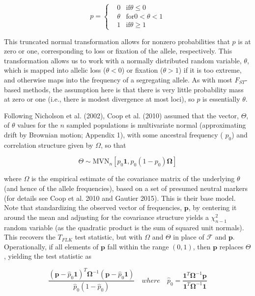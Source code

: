 \documentclass{article}
\begin{document}
\begin{equation}
p=\left\{\begin{aligned}&0&\text{if}\theta\leq0\\&\theta&\text{for}0<\theta<1\\&1&\text{if}\theta\geq1\end{aligned}\right.
\tag{9.13a}
\label{eq:9_13a}
\end{equation}

This truncated normal transformation allows for nonzero probabilities that $p$ is at zero or one, corresponding to loss or fixation of the allele, respectively. This transformation allows us to work with a normally distributed random variable, $\theta$, which is mapped into allelic loss ($\theta < 0$) or fixation ($\theta > 1$) if it is too extreme, and otherwise maps into the frequency of a segregating allele. As with most $F_{ST}$-based methods, the assumption here is that there is very little probability mass at zero or one (i.e., there is modest divergence at most loci), so $p$ is essentially $\theta$.

Following Nicholson et al. (2002), Coop et al. (2010) assumed that the vector,  $ \Theta $, of  $ \theta $ values for the  $ n $ sampled populations is multivariate normal (approximating drift by Brownian motion; Appendix 1), with some ancestral frequency ( $ p_0 $) and correlation structure given by  $ \Omega $, so that

\begin{equation}
\Theta\sim\mathrm{M V N}_{n}\left[p_{0}\mathbf{1},p_{0}(1-p_{0})\boldsymbol{\Omega}\right]
\tag{9.13b}
\label{eq:9_13b}
\end{equation}

where $\Omega$ is the empirical estimate of the covariance matrix of the underlying $\theta$ (and hence of the allele frequencies), based on a set of presumed neutral markers (for details see Coop et al. 2010 and Gautier 2015). This is their base model. Note that standardizing the observed vector of frequencies, $\mathbf{p}$, by centering it around the mean and adjusting for the covariance structure yields a $\chi_{n-1}^{2}$ random variable (as the quadratic product is the sum of squared unit normals). This recovers the $T_{FLK}$ test statistic, but with $\Omega$ and $\Theta$ in place of $\mathcal{F}$ and $\mathbf{p}$. Operationally, if all elements of $\mathbf{p}$ fall within the range $(0, 1)$, then $\mathbf{p}$ replaces $\Theta$, yielding the test statistic as

\begin{equation}
\frac{(\mathbf{p}-\widehat{p}_{0}\mathbf{1})^{T}\boldsymbol{\Omega}^{-1}(\mathbf{p}-\widehat{p}_{0}\mathbf{1})}{\widehat{p}_{0}(1-\widehat{p}_{0})}\quad where\quad\widehat{p}_{0}=\frac{\mathbf{1}^{T}\boldsymbol{\Omega}^{-1}\mathbf{p}}{\mathbf{1}^{T}\boldsymbol{\Omega}^{-1}\mathbf{1}}
\tag{9.13c}
\label{eq:9_13c}
\end{equation}
\end{document}
